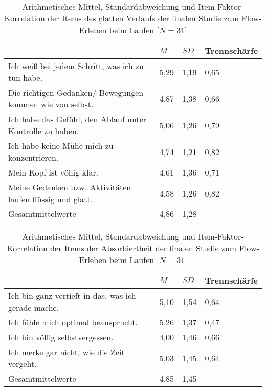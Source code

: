 \begin{table}
	[!htb] \centering \caption[Item-Faktor-Korrelation der Items des glatten Verlaufs (Laufstudie -- interindividuell)]{Arithmetisches Mittel, Standardabweichung und Item-Faktor-Korrelation der Items des glatten Verlaufs der finalen Studie zum Flow-Erleben beim Laufen [$N = 31$]} \label{tab:glatter_verlauf_3} 
	\begin{tabularx}
		{ 
		\textwidth}{p{} p{} p{} p{}} \toprule & $M$ & $SD$ & Trennschärfe \\
		\midrule Ich weiß bei jedem Schritt, was ich zu tun habe. & 5,29 & 1,19 & 0,65 \\ 
  Die richtigen Gedanken/ Bewegungen kommen wie von selbst. & 4,87 & 1,38 & 0,66 \\ 
  Ich habe das Gefühl, den Ablauf unter Kontrolle zu haben. & 5,06 & 1,26 & 0,79 \\ 
  Ich habe keine Mühe mich zu konzentrieren. & 4,74 & 1,21 & 0,82 \\ 
  Mein Kopf ist völlig klar. & 4,61 & 1,36 & 0,71 \\ 
  Meine Gedanken bzw. Aktivitäten laufen flüssig und glatt. & 4,58 & 1,26 & 0,82 \\ 
  Gesamtmittelwerte & 4,86 & 1,28 &  \\ 
		\bottomrule 
	\end{tabularx}
\end{table}
\begin{table}
	[!htb] \centering \caption[Item-Faktor-Korrelation der Items der Absorbiertheit (Laufstudie -- interindividuell)]{Arithmetisches Mittel, Standardabweichung und Item-Faktor-Korrelation der Items der Absorbiertheit der finalen Studie zum Flow-Erleben beim Laufen [$N = 31$]} \label{tab:absorbiertheit_3} 
	\begin{tabularx}
		{ 
		\textwidth}{p{} p{} p{} p{}} \toprule & $M$ & $SD$ & Trennschärfe \\
		\midrule Ich bin ganz vertieft in das, was ich gerade mache. & 5,10 & 1,54 & 0,64 \\ 
  Ich fühle mich optimal beansprucht. & 5,26 & 1,37 & 0,47 \\ 
  Ich bin völlig selbstvergessen. & 4,00 & 1,46 & 0,66 \\ 
  Ich merke gar nicht, wie die Zeit vergeht. & 5,03 & 1,45 & 0,64 \\ 
  Gesamtmittelwerte & 4,85 & 1,45 &  \\ 
		\bottomrule 
	\end{tabularx}
\end{table}

